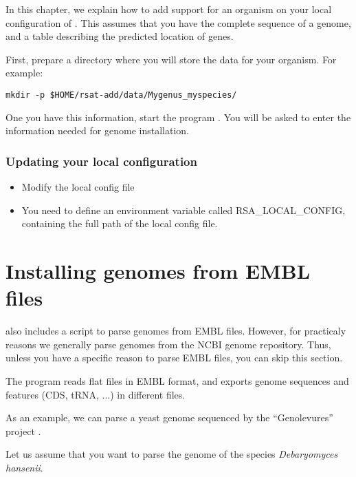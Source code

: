 In this chapter, we explain how to add support for an organism on your
local configuration of \RSAT. This assumes that you have the complete
sequence of a genome, and a table describing the predicted location of
genes.

First, prepare a directory where you will store the data for your
organism. For example:

\begin{footnotesize}
\begin{verbatim}
mkdir -p $HOME/rsat-add/data/Mygenus_myspecies/
\end{verbatim}
\end{footnotesize}


One you have this information, start the program
. You will be asked to enter the information
needed for genome installation.

\subsubsection{Updating your local configuration}


\begin{itemize}
\item Modify the local config file

\item You need to define an environment variable called
  RSA\_LOCAL\_CONFIG, containing the full path of the local config
  file.

\end{itemize}


\section{Installing genomes from EMBL files}

\RSAT also includes a script  to parse genomes
from EMBL files. However, for practicaly reasons we generally parse
genomes from the NCBI genome repository. Thus, unless you have a
specific reason to parse EMBL files, you can skip this section.

The program  reads flat files in EMBL format,
and exports genome sequences and features (CDS, tRNA, ...) in
different files.

As an example, we can parse a yeast genome sequenced by the
``Genolevures'' project
.

Let us assume that you want to parse the genome of the species
\textit{Debaryomyces hansenii}.

